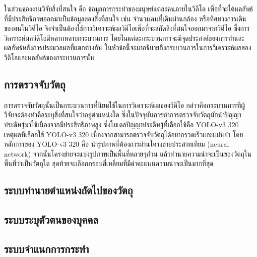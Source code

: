 ในส่วนของงานวิจัยสิ่งที่สนใจ คือ ข้อมูลการกระทำของมนุษย์แต่ละคนภายในวิดีโอ เพื่อที่จะได้ผลลัพธ์ที่มีประสิทธิภาพออกมาเป็นข้อมูลของสิ่งที่สนใจ เช่น จำนวนคนที่เดินผ่านกล้อง 
หรือทิศทางการเดินของคนในวิดีโอ จึงจำเป็นต้องใช้การวิเคราะห์ผลวิดีโอเพื่อที่จะสกัดสิ่งที่สนใจออกมาจากวิดีโอ ซึ่งการวิเคราะห์ผลวิดีโอมีหลากหลายกระบวนการ 
โดยในแต่ละกระบวนการจะมีจุดประสงค์ของการทำและผลลัพธ์หลังการประมวลผลที่แตกต่างกัน ในหัวข้อนี้จะมาอธิบายถึงกระบวนการในการวิเคราะห์ผลของวิดิโอและผลลัพธ์ของกระบวนการนั้น

\subsection{การตรวจจับวัตถุ}
การตรวจจับวัตถุนั้นเป็นกระบวนการที่นิยมใช้ในการวิเคราะห์ผลของวิดีโอ กล่าวคือกระบวนการที่ผู้วิจัยจะต้องทำคือระบุสิ่งที่สนใจว่าอยู่ตำแหน่งใด 
ซึ่งในปัจจุบันการทำการตรวจจับวัตถุมักนำปัญญาประดิษฐ์มาใช้เนื่องจากมีประสิทธิภาพสูง ซึ่งโมเดลปัญญาประดิษฐ์ที่เลือกใช้คือ YOLO-v3 320
เหตุผลที่เลือกใช้ YOLO-v3 320 เนื่องจากสามารถตรวจจับวัตถุได้อยากรวดเร็วและแม่นยำ โดยหลักการของ YOLO-v3 320 คือ นำรูปภาพที่ต้องการผ่านโครงข่ายประสาทเทียม (neural network)
จากนั้นโครงข่ายจะแบ่งรูปภาพเป็นพื้นที่หลายๆส่วน แล้วทำนายความน่าจะเป็นของวัตถุในพื้นที่ว่าเป็นวัตถุใด สุดท้ายจะเลือกกรอบสี่เหลี่ยมที่มีค่าคะแนนความน่าจะเป็นมากที่สุด

\clearpage
\subsection{ระบบทำนายตำแหน่งถัดไปของวัตถุ}


\subsection{ระบบระบุตัวตนของบุคคล}


\subsection{ระบบจำแนกการกระทำ}
